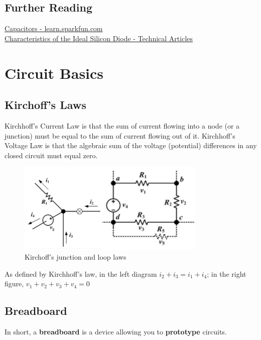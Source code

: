 \documentclass{article}
\begin{document}
\subsection{Further Reading}
\noindent \href{https://learn.sparkfun.com/tutorials/capacitors/introduction}{Capacitors - learn.sparkfun.com} \\
\href{https://www.allaboutcircuits.com/technical-articles/characteristics-of-the-ideal-diode/}{Characteristics of the Ideal Silicon Diode - Technical Articles}

\section{Circuit Basics}

\subsection{Kirchoff's Laws}
Kirchhoff's Current Law is that the sum of current flowing into a node (or a junction) must be equal to the sum of current flowing out of it.
Kirchhoff’s Voltage Law is that the algebraic sum of the voltage (potential) differences in any closed circuit must equal zero.

\begin{figure} [h]
    \centering
    \includegraphics[width=0.8\textwidth]{img/Kirchoff.png}
    \caption{Kirchoff's junction and loop laws}
    \label{fig:Kirchoff}
\end{figure}

As defined by Kirchhoff’s law, in the left diagram $i_{2} + i_{3} = i_{1} + i_{4}$; in the right figure,
$v_{1} + v_{2} + v_{3} + v_{4} = 0$

\subsection{Breadboard}
In short, a \textbf{breadboard} is a device allowing you to \textbf{prototype} circuits. \\
\end{document}
